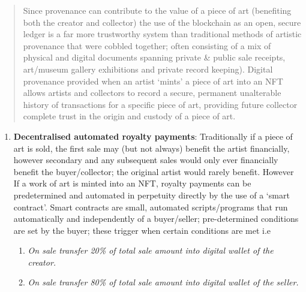 \begin{quote}
Since provenance can contribute to the value of a piece of art
(benefiting both the creator and collector) the use of the blockchain as
an open, secure ledger is a far more trustworthy system than traditional
methods of artistic provenance that were cobbled together; often
consisting of a mix of physical and digital documents spanning private
\& public sale receipts, art/museum gallery exhibitions and private
record keeping). Digital provenance provided when an artist `mints' a
piece of art into an NFT allows artists and collectors to record a
secure, permanent unalterable history of transactions for a specific
piece of art, providing future collector complete trust in the origin
and custody of a piece of art.
\end{quote}

\begin{enumerate}
\def\labelenumi{\alph{enumi}.}
\setcounter{enumi}{1}
\item
  \textbf{Decentralised automated royalty payments}: Traditionally if a
  piece of art is sold, the first sale may (but not always) benefit the
  artist financially, however secondary and any subsequent sales would
  only ever financially benefit the buyer/collector; the original artist
  would rarely benefit. However If a work of art is minted into an NFT,
  royalty payments can be predetermined and automated in perpetuity
  directly by the use of a `smart contract'. Smart contracts are small,
  automated scripts/programs that run automatically and independently of
  a buyer/seller; pre-determined conditions are set by the buyer; these
  trigger when certain conditions are met i.e

  \begin{enumerate}
  \def\labelenumii{\roman{enumii}.}
  \item
    \emph{On sale transfer 20\% of total sale amount into digital wallet
    of the creator.}
  \item
    \emph{On sale transfer 80\% of total sale amount into digital wallet
    of the seller.}
  \end{enumerate}
\end{enumerate}

